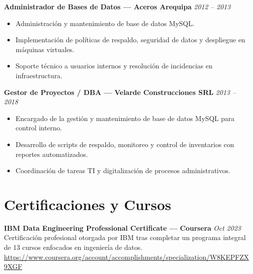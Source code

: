 \documentclass[a4paper,10pt]{article}
\begin{document}
\vspace{5pt}

\textbf{Administrador de Bases de Datos — Aceros Arequipa} \hfill \textit{2012 – 2013} \\
\begin{itemize}[leftmargin=*]
    \item Administración y mantenimiento de base de datos MySQL.
    \item Implementación de políticas de respaldo, seguridad de datos y despliegue en máquinas virtuales.
    \item Soporte técnico a usuarios internos y resolución de incidencias en infraestructura.
\end{itemize}

\vspace{5pt}

\textbf{Gestor de Proyectos / DBA — Velarde Construcciones SRL} \hfill \textit{2013 – 2018} \\
\begin{itemize}[leftmargin=*]
    \item Encargado de la gestión y mantenimiento de base de datos MySQL para control interno.
    \item Desarrollo de scripts de respaldo, monitoreo y control de inventarios con reportes automatizados.
    \item Coordinación de tareas TI y digitalización de procesos administrativos.
\end{itemize}

\vspace{10pt}

\section*{Certificaciones y Cursos}

\textbf{IBM Data Engineering Professional Certificate — Coursera} \hfill \textit{Oct 2023} \\
Certificación profesional otorgada por IBM tras completar un programa integral de 13 cursos enfocados en ingeniería de datos. \\
\url{https://www.coursera.org/account/accomplishments/specialization/W8KEPFZX9XGF}

\vspace{2pt}
\end{document}
